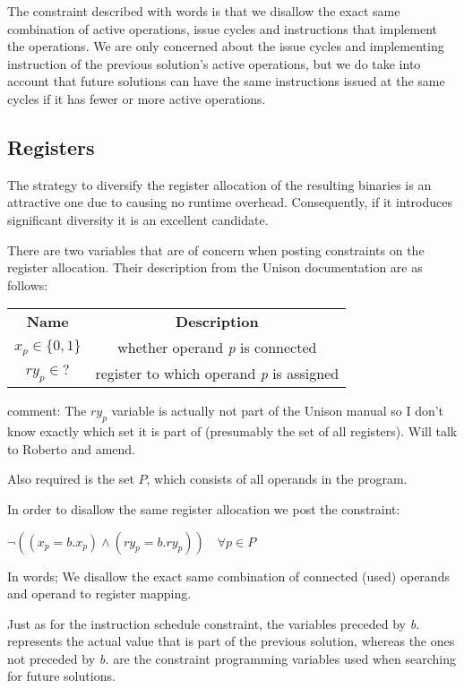 The constraint described with words is that we disallow the exact same combination of
active operations, issue cycles and instructions that implement the operations. We are
only concerned about the issue cycles and implementing instruction of the previous
solution's active operations, but we do take into account that future solutions can have
the same instructions issued at the same cycles if it has fewer or more active operations.

\subsection{Registers}

The strategy to diversify the register allocation of the resulting binaries is an attractive
one due to causing no runtime overhead. Consequently, if it introduces significant diversity
it is an excellent candidate.

There are two variables that are of concern when posting constraints on the register
allocation. Their description from the Unison documentation are as follows:

\vspace{0.2cm}

\begin{tabular}{cc}
	\textbf{Name} & \textbf{Description} \\
	$x_p \in \{0, 1\}$ & whether operand \textit{p} is connected \\
	$ry_p \in ?$  & register to which operand \textit{p} is assigned \\
\end{tabular}

comment: The $ry_p$ variable is actually not part of the Unison manual so I don't know
exactly which set it is part of (presumably the set of all registers). Will talk to
Roberto and amend.

\vspace{0.2cm}

Also required is the set $P$, which consists of all operands in the program.

\vspace{0.2cm}

In order to disallow the same register allocation we post the constraint:

\vspace{0.2cm}

$\neg( (x_p = b.x_p) \land (ry_p = b.ry_p) ) \quad \forall p \in P$

\vspace{0.2cm}

In words; We disallow the exact same combination of connected (used) operands and
operand to register mapping.

Just as for the instruction schedule constraint, the variables preceded by \textit{b.}
represents the actual value that is part of the previous solution, whereas the ones not
preceded by \textit{b.} are the constraint programming variables used when searching for
future solutions.

